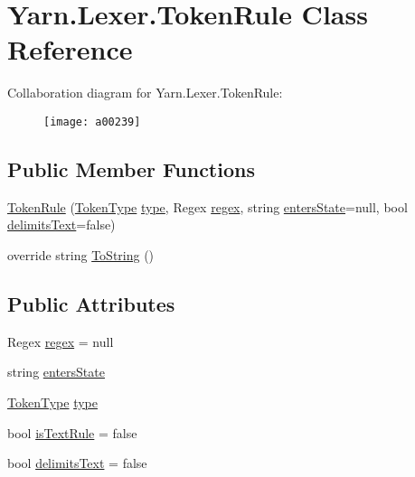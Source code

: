 \hypertarget{a00082}{\section{Yarn.\-Lexer.\-Token\-Rule Class Reference}
\label{a00082}
}


Collaboration diagram for Yarn.\-Lexer.\-Token\-Rule\-:
\nopagebreak
\begin{figure}[H]
\begin{center}
\leavevmode
\texttt{[image: a00239]}
\end{center}
\end{figure}
\subsection*{Public Member Functions}
\begin{DoxyCompactItemize}
\item 
\hyperlink{a00082_a3d171ae7c4870659d2d1d977a216bdd7}{Token\-Rule} (\hyperlink{a00026_a301aa7c866593a5b625a8fc158bbeace}{Token\-Type} \hyperlink{a00082_a0de6fac3b55cf0c61e07cea53ce67caa}{type}, Regex \hyperlink{a00082_a47a404d6637fae489c3c77729a01cc69}{regex}, string \hyperlink{a00082_af6a4bd3416c4e1b8e56f9db461d52d18}{enters\-State}=null, bool \hyperlink{a00082_ab0849136a1f27b4d13cb7a45e2fe7130}{delimits\-Text}=false)
\item 
override string \hyperlink{a00082_a1ed23ad16b116ecb06dd75b157bf752f}{To\-String} ()
\end{DoxyCompactItemize}
\subsection*{Public Attributes}
\begin{DoxyCompactItemize}
\item 
Regex \hyperlink{a00082_a47a404d6637fae489c3c77729a01cc69}{regex} = null
\item 
string \hyperlink{a00082_af6a4bd3416c4e1b8e56f9db461d52d18}{enters\-State}
\item 
\hyperlink{a00026_a301aa7c866593a5b625a8fc158bbeace}{Token\-Type} \hyperlink{a00082_a0de6fac3b55cf0c61e07cea53ce67caa}{type}
\item 
bool \hyperlink{a00082_a09f49e6edf9ace38a92d723998181f8f}{is\-Text\-Rule} = false
\item 
bool \hyperlink{a00082_ab0849136a1f27b4d13cb7a45e2fe7130}{delimits\-Text} = false
\end{DoxyCompactItemize}



